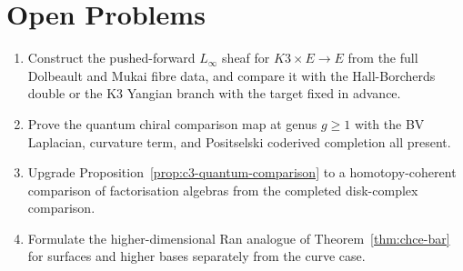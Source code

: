 \documentclass[11pt]{amsart}
\theoremstyle{plain}
\theoremstyle{definition}
\theoremstyle{remark}
\begin{document}
\section{Open Problems}
\label{sec:open}

\begin{enumerate}[label=\textup{(\arabic*)}]
\item Construct the pushed-forward $L_\infty$ sheaf for
$K3\times E\to E$ from the full Dolbeault and Mukai fibre data, and
compare it with the Hall-Borcherds double or the K3 Yangian branch with
the target fixed in advance.
\item Prove the quantum chiral comparison map at genus $g\geq 1$ with
the BV Laplacian, curvature term, and Positselski coderived completion
all present.
\item Upgrade Proposition~\ref{prop:c3-quantum-comparison} to a
homotopy-coherent comparison of factorisation algebras from the
completed disk-complex comparison.
\item Formulate the higher-dimensional Ran analogue of
Theorem~\ref{thm:chce-bar} for surfaces and higher bases separately
from the curve case.
\end{enumerate}
\end{document}
